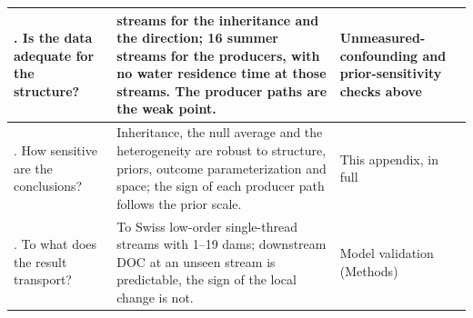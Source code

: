 \documentclass[11pt,a4paper]{article}
\begin{document}
\begin{center}
\begin{small}
\begin{longtable}{|>{\raggedright\arraybackslash}p{}|>{\raggedright\arraybackslash}p{}|>{\raggedright\arraybackslash}p{}|}
6. Is the data adequate for the structure? & 158 streams for the inheritance and the direction; 16 summer streams for the producers, with no water residence time at those streams. The producer paths are the weak point. & Unmeasured-confounding and prior-sensitivity checks above \\ \hline
7. How sensitive are the conclusions? & Inheritance, the null average and the heterogeneity are robust to structure, priors, outcome parameterization and space; the sign of each producer path follows the prior scale. & This appendix, in full \\ \hline
8. To what does the result transport? & To Swiss low-order single-thread streams with 1--19 dams; downstream DOC at an unseen stream is predictable, the sign of the local change is not. & Model validation (Methods) \\ \hline
\end{longtable}
\end{small}
\end{center}

\FloatBarrier
\end{document}
